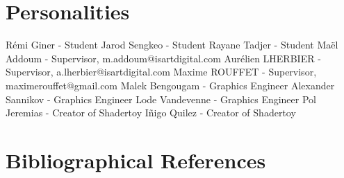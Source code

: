 \documentclass{rapportCS}
\begin{document}
\section*{Personalities}

Rémi Giner - Student
Jarod Sengkeo - Student
Rayane Tadjer - Student
Maël Addoum - Supervisor, m.addoum@isartdigital.com
Aurélien LHERBIER - Supervisor, a.lherbier@isartdigital.com
Maxime ROUFFET - Supervisor, maximerouffet@gmail.com
Malek Bengougam - Graphics Engineer
Alexander Sannikov - Graphics Engineer
Lode Vandevenne - Graphics Engineer
Pol Jeremias - Creator of Shadertoy
Iñigo Quilez - Creator of Shadertoy


\section*{Bibliographical References}



\newpage
\end{document}
